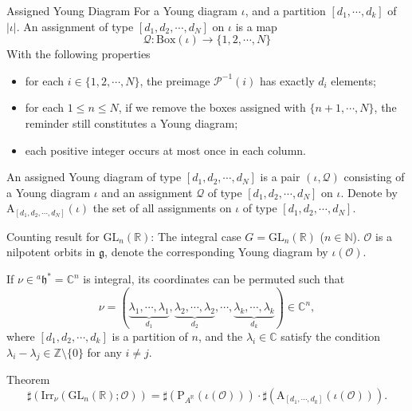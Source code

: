 \documentclass[fleqn,xcolor=dvipsnames]{beamer}
\newcommand{\BC}{{\mathbb {C}}}
\newcommand{\BN}{{\mathbb {N}}}
\newcommand{\BR}{{\mathbb {R}}}
\newcommand{\BZ}{{\mathbb {Z}}}
\newcommand{\CO}{{\mathcal {O}}}
\newcommand{\CP}{{\mathcal {P}}}
\newcommand{\CQ}{{\mathcal {Q}}}
\newcommand{\RA}{{\mathrm {A}}}
\newcommand{\fg}{\mathfrak{g}}
\newcommand{\fh}{\mathfrak{h}}
\newcommand{\GL}{{\mathrm{GL}}}
\newcommand{\Irr}{{\mathrm{Irr}}}
\begin{document}
\begin{frame}
  \begin{block}{Assigned Young Diagram}
    For a Young diagram $\iota$, and a partition $[d_1, \cdots, d_k]$ of $|\iota|$.  An assignment of type $[d_1,d_2, \cdots, d_N]$ on $\iota$ is a map
   $$\CQ: \mathrm{Box}(\iota) \to \{1,2, \cdots,N\} $$
   With the following properties

   \begin{itemize}
      \pause\item for each $i \in \{1,2,\cdots,N\}$, the preimage $\CP^{-1}(i)$ has exactly $d_i$ elements;
      \pause\item for each $1 \leq n \leq N$, if we remove the boxes assigned with $\{n+1, \cdots, N\}$, the reminder still constitutes a Young diagram;
      \pause\item each positive integer occurs at most once in each column.
   \end{itemize}
   \pause An assigned Young diagram of type $[d_1,d_2, \cdots, d_N]$ is a pair $(\iota,\CQ)$ consisting of a Young diagram $\iota$ and an assignment $\CQ$ of type $[d_1,d_2, \cdots, d_N]$ on $\iota$. Denote by $\RA_{[d_1,d_2,\cdots,d_N]}(\iota)$ the set of all assignments on $\iota$ of type $[d_1,d_2,\cdots,d_N]$.
  \end{block}
\end{frame}



\begin{frame}{Counting result for $\GL_n(\BR)$: The integral case}
  $G = \GL_n(\BR)$ ($n \in \BN$). $\CO$ is a nilpotent orbits in $\fg$, denote the corresponding Young diagram by $\iota(\CO)$.\par
    If $\nu \in {^{a}\fh^*} = \BC^n$ is integral, its coordinates can be permuted such that 
        \[
        \nu = (\underbrace{\lambda_1, \cdots, \lambda_1}_{d_1}, \underbrace{\lambda_2, \cdots, \lambda_2}_{d_2}, \cdots, \underbrace{\lambda_k, \cdots, \lambda_k}_{d_k}) \in \BC^n,
        \]
        where $[d_1, d_2, \cdots , d_k]$ is a partition of $n$, and the $\lambda_i \in \BC$ satisfy the condition $\lambda_i - \lambda_j \in \BZ \setminus \{0\}$ for any $i \neq j$.
  \pause\begin{block}{Theorem}
        \begin{equation*}
            \sharp(\Irr_\nu(\GL_{n}(\BR);\CO)) = \sharp\left(\mathrm{P}_{A^{\BR}}(\iota(\CO))\right)\cdot \sharp\left(\RA_{[d_1,\cdots,d_k]}(\iota(\CO))\right).
        \end{equation*}
  \end{block}
\end{frame}
\end{document}
